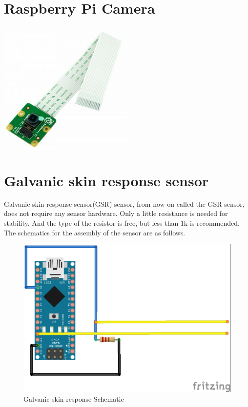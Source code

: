 \documentclass{report}
\begin{document}
\chapter{Raspberry Pi Camera}
\includegraphics[width=0.50\textwidth]{images/Raspberry-Pi-Camera-Board-v2-1.png}

\chapter{Galvanic skin response sensor}
Galvanic skin response sensor(GSR) sensor, from now on called the GSR sensor, does not require any sensor hardware. Only a little resistance is needed for stability. And the type of the resistor is free, but less than 1k is recommended. The schematics for the assembly of the sensor are as follows. \\

\begin{figure}[H]
\begin{center}
\includegraphics[scale=1.25]{images/GSR.jpg}
\caption{Galvanic skin response Schematic}
\end{center}
\end{figure}
\end{document}
